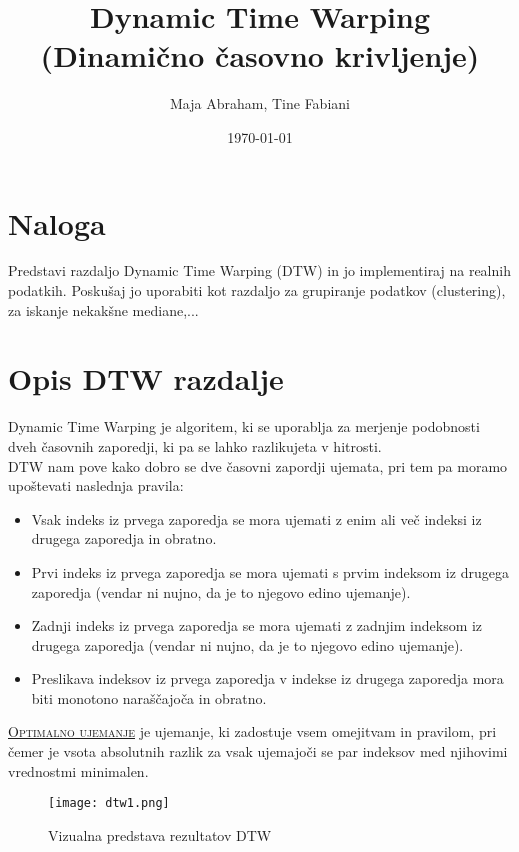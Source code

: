 \documentclass{article}
\title{Dynamic Time Warping \\ (Dinamično časovno krivljenje)}
\author{Maja Abraham, Tine Fabiani}
\date{\today}
\begin{document}
    
\maketitle

\section{Naloga}
Predstavi razdaljo Dynamic Time Warping (DTW) in jo implementiraj na 
realnih podatkih. Poskušaj jo uporabiti kot razdaljo za grupiranje podatkov (clustering), za
iskanje nekakšne mediane,... 
\section{Opis DTW razdalje}
Dynamic Time Warping je algoritem, ki se uporablja za merjenje podobnosti dveh
časovnih zaporedji, ki pa se lahko razlikujeta v hitrosti. \\
DTW nam pove kako dobro se dve časovni zapordji ujemata,
pri tem pa moramo upoštevati naslednja pravila:
\begin{itemize}
    \item Vsak indeks iz prvega zaporedja se mora ujemati z enim ali več indeksi iz drugega zaporedja in obratno.
    \item Prvi indeks iz prvega zaporedja se mora ujemati s prvim indeksom iz drugega zaporedja (vendar ni nujno, da je to njegovo edino ujemanje).
    \item Zadnji indeks iz prvega zaporedja se mora ujemati z zadnjim indeksom iz drugega zaporedja (vendar ni nujno, da je to njegovo edino ujemanje).
    \item Preslikava indeksov iz prvega zaporedja v indekse iz drugega zaporedja mora biti monotono naraščajoča in obratno.
    
\end{itemize}

\underline{\textsc{Optimalno ujemanje}} je ujemanje, ki zadostuje vsem omejitvam in pravilom, pri čemer je vsota absolutnih razlik za vsak ujemajoči
 se par indeksov med njihovimi vrednostmi minimalen.

\begin{figure}[h!]
    \centering
    \texttt{[image: dtw1.png]}
    \caption{Vizualna predstava rezultatov DTW}
\end{figure}
\end{document}
